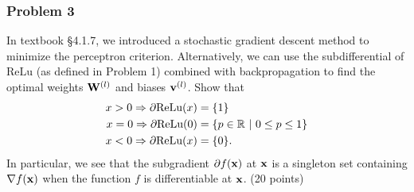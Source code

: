 \documentclass[12pt,a4paper]{article}
\renewcommand{\v}[1]{\ifmmode\mathbf{#1}\fi}
\newcommand{\ra}[1]{\ifnum #1=1\rightarrow\fi\ifnum #1=2\Rightarrow\fi\ifnum #1=3\Rrightarrow\fi\ifnum #1=4\rightrightarrows\fi\ifnum #1=5\rightleftarrows\fi\ifnum #1=6\mapsto\fi\ifnum #1=7\iffalse\fi\fi\ifnum #1=8\twoheadrightarrow\fi\ifnum #1=9\rightharpoonup\fi\ifnum #1=0\rightharpoondown\fi}
\newcommand{\R}{\ifmmode\mathbb R\fi}
\newcommand{\ReLu}{\text{ReLu}}
\begin{document}
\subsubsection*{Problem 3}
In textbook \S4.1.7, we introduced a stochastic gradient descent method to minimize the perceptron criterion. Alternatively, we can use the subdifferential of $\ReLu$ (as defined in Problem 1) combined with backpropagation to find the optimal weights $\v W^{(l)}$ and biases $\v v^{(l)}$.
Show that 
\begin{align*}
	x > 0 \ra2 \partial\ReLu(x) &= \{1\} \\
	x = 0 \ra2 \partial\ReLu(0) &= \{p \in \R \ \vert\ 0 \leq p \leq 1 \} \\
	x < 0 \ra2 \partial\ReLu(x) &= \{0\}.
\end{align*}
In particular, we see that the subgradient $\partial f(\v x)$ at $\v x$ is a singleton set containing $\nabla f(\v x)$ when the function $f$ is differentiable at $\v x$. (20 points) \\
\end{document}
